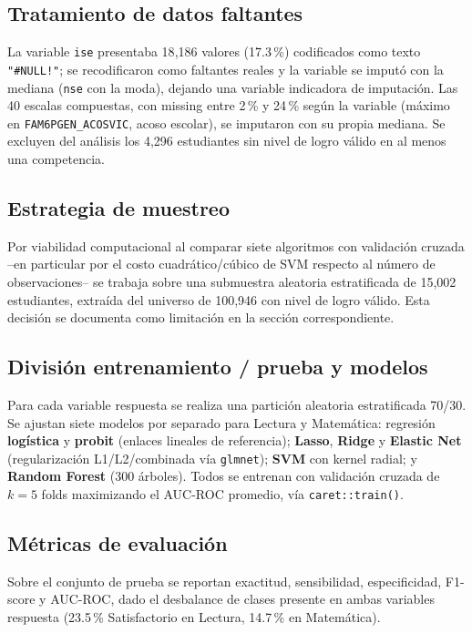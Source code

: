 \documentclass[11pt]{article}
\begin{document}
\subsection{Tratamiento de datos faltantes}

La variable \texttt{ise} presentaba 18{,}186 valores (17.3\,\%)
codificados como texto \texttt{"\#NULL!"}; se recodificaron como
faltantes reales y la variable se imputó con la mediana (\texttt{nse}
con la moda), dejando una variable indicadora de imputación. Las 40
escalas compuestas, con missing entre 2\,\% y 24\,\% según la variable
(máximo en \texttt{FAM6PGEN\_ACOSVIC}, acoso escolar), se imputaron con
su propia mediana. Se excluyen del análisis los 4{,}296 estudiantes sin
nivel de logro válido en al menos una competencia.

\subsection{Estrategia de muestreo}

Por viabilidad computacional al comparar siete algoritmos con validación
cruzada --en particular por el costo cuadrático/cúbico de SVM respecto
al número de observaciones-- se trabaja sobre una submuestra aleatoria
estratificada de 15{,}002 estudiantes, extraída del universo de 100{,}946
con nivel de logro válido. Esta decisión se documenta como limitación en
la sección correspondiente.

\subsection{División entrenamiento / prueba y modelos}

Para cada variable respuesta se realiza una partición aleatoria
estratificada 70/30. Se ajustan siete modelos por separado para Lectura
y Matemática: regresión \textbf{logística} y \textbf{probit} (enlaces
lineales de referencia); \textbf{Lasso}, \textbf{Ridge} y
\textbf{Elastic Net} (regularización L1/L2/combinada vía
\texttt{glmnet}); \textbf{SVM} con kernel radial; y \textbf{Random
Forest} (300 árboles). Todos se entrenan con validación cruzada de
$k=5$ folds maximizando el AUC-ROC promedio, vía \texttt{caret::train()}.

\subsection{Métricas de evaluación}

Sobre el conjunto de prueba se reportan exactitud, sensibilidad,
especificidad, F1-score y AUC-ROC, dado el desbalance de clases presente
en ambas variables respuesta (23.5\,\% Satisfactorio en Lectura, 14.7\,\%
en Matemática).
\end{document}
